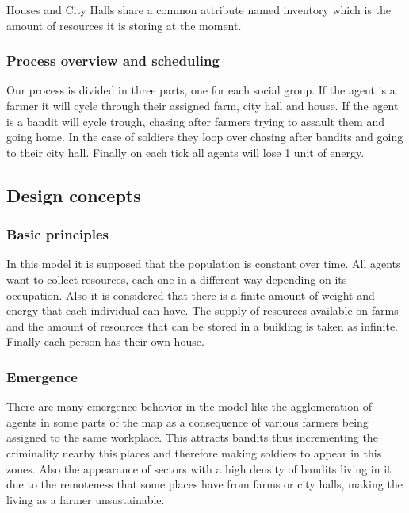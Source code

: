 \documentclass{wscpaperproc}
\begin{document}
\noindent Houses and City Halls share a common attribute named inventory which
is the amount of resources it is storing at the moment.\hfill\break

\subsubsection{Process overview and scheduling}

Our process is divided in three parts, one for each social group. If the
agent is a farmer it will cycle through their assigned farm, city hall and
house. If the agent is a bandit will cycle trough, chasing after farmers trying
to assault them and going home. In the case of soldiers they loop over chasing
after bandits and going to their city hall. Finally on each tick all agents
will lose 1 unit of energy.

\subsection{Design concepts}

\subsubsection{Basic principles}

In this model it is supposed that the population is constant over time.  All
agents want to collect resources, each one in a different way depending on its
occupation. Also it is considered that there is a finite amount of weight and
energy that each individual can have. The supply of resources available on
farms and the amount of resources that can be stored in a building is taken
as infinite. Finally each person has their own house.

\subsubsection{Emergence}

There are many emergence behavior in the model like the agglomeration of
agents in some parts of the map as a consequence of various farmers being
assigned to the same workplace. This attracts bandits thus incrementing the
criminality nearby this places and therefore making soldiers to appear in this
zones. Also the appearance of sectors with a high density of bandits living in
it due to the remoteness that some places have from farms or city halls, making
the living as a farmer unsustainable.
\end{document}

